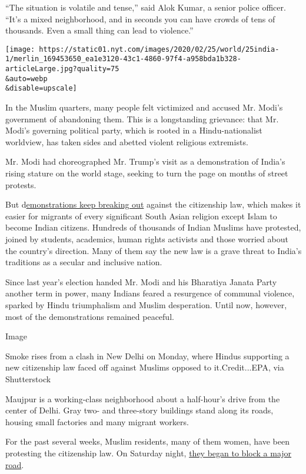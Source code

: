 ``The situation is volatile and tense,'' said Alok Kumar, a senior
police officer. ``It's a mixed neighborhood, and in seconds you can have
crowds of tens of thousands. Even a small thing can lead to violence.''

\texttt{[image: https://static01.nyt.com/images/2020/02/25/world/25india-1/merlin\_169453650\_ea1e3120-43c1-4860-97f4-a958bda1b328-articleLarge.jpg?quality=75\\\&auto=webp\\\&disable=upscale]}

In the Muslim quarters, many people felt victimized and accused Mr.
Modi's government of abandoning them. This is a longstanding grievance:
that Mr. Modi's governing political party, which is rooted in a
Hindu-nationalist worldview, has taken sides and abetted violent
religious extremists.

Mr. Modi had choreographed Mr. Trump's visit as a demonstration of
India's rising stature on the world stage, seeking to turn the page on
months of street protests.

But
d\href{https://www.nytimes.com/2020/01/17/world/asia/india-protests-aishe-ghosh.html}{emonstrations
keep breaking out} against the citizenship law, which makes it easier
for migrants of every significant South Asian religion except Islam to
become Indian citizens. Hundreds of thousands of Indian Muslims have
protested, joined by students, academics, human rights activists and
those worried about the country's direction. Many of them say the new
law is a grave threat to India's traditions as a secular and inclusive
nation.

Since last year's election handed Mr. Modi and his Bharatiya Janata
Party another term in power, many Indians feared a resurgence of
communal violence, sparked by Hindu triumphalism and Muslim desperation.
Until now, however, most of the demonstrations remained peaceful.

Image

Smoke rises from a clash in New Delhi on Monday, where Hindus supporting
a new citizenship law faced off against Muslims opposed to
it.Credit...EPA, via Shutterstock

Maujpur is a working-class neighborhood about a half-hour's drive from
the center of Delhi. Gray two- and three-story buildings stand along its
roads, housing small factories and many migrant workers.

For the past several weeks, Muslim residents, many of them women, have
been protesting the citizenship law. On Saturday night,
\href{https://www.firstpost.com/india/jaffrabad-anti-caa-protests-over-500-women-block-road-connecting-seelampur-with-maujpur-and-yamuna-vihar-delhi-metro-shuts-station-8076371.html}{they
began to block a major road}.

